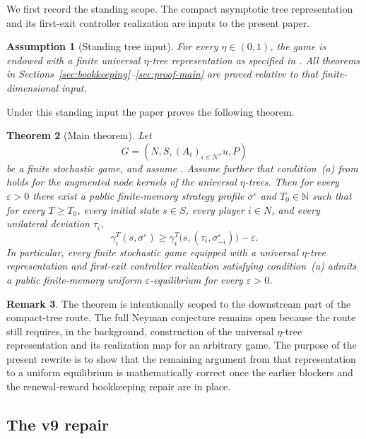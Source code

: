 \documentclass[12pt]{article}
\newtheorem{theorem}{Theorem}[section]
\newtheorem{assumption}[theorem]{Assumption}
\theoremstyle{definition}
\newtheorem{remark}[theorem]{Remark}
\newcommand{\eps}{\varepsilon}
\newcommand{\N}{\mathbb{N}}
\newcommand{\1}{\mathbf{1}}
\begin{document}
We first record the standing scope. The compact asymptotic tree representation and
its first-exit controller realization are inputs to the present paper.

\begin{assumption}[Standing tree input]
\label{ass:tree-input}
For every $\eta\in(0,1)$, the game is endowed with a finite universal
$\eta$-tree representation as specified in
. All theorems in
Sections~\ref{sec:bookkeeping}--\ref{sec:proof-main} are proved relative to that
finite-dimensional input.
\end{assumption}

Under this standing input the paper proves the following theorem.

\begin{theorem}[Main theorem]
\label{thm:main}
Let
\[
G=(N,S,(A_i)_{i\in N},u,P)
\]
be a finite stochastic game, and assume . Assume further
that condition~\textnormal{(a)} from  holds for the augmented node
kernels of the universal $\eta$-trees. Then for every $\eps>0$ there exist a
public finite-memory strategy profile $\sigma^\eps$ and $T_0\in\N$ such that for
every $T\ge T_0$, every initial state $s\in S$, every player $i\in N$, and every
unilateral deviation $\tau_i$,
\[
\gamma_i^T(s,\sigma^\eps)
\ge
\gamma_i^T\bigl(s,(\tau_i,\sigma^\eps_{-i})\bigr)-\eps.
\]
In particular, every finite stochastic game equipped with a universal
$\eta$-tree representation and first-exit controller realization satisfying
condition~\textnormal{(a)} admits a public finite-memory uniform
$\eps$-equilibrium for every $\eps>0$.
\end{theorem}

\begin{remark}
The theorem is intentionally scoped to the downstream part of the compact-tree
route. The full Neyman conjecture remains open because the route still requires,
in the background, construction of the universal $\eta$-tree representation and
its realization map for an arbitrary game. The purpose of the present rewrite is
to show that the remaining argument from that representation to a uniform
equilibrium is mathematically correct once the earlier blockers and the
renewal-reward bookkeeping repair are in place.
\end{remark}


\subsection{The v9 repair}
\end{document}
